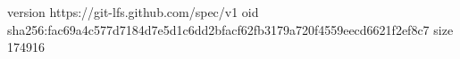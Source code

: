 version https://git-lfs.github.com/spec/v1
oid sha256:fac69a4c577d7184d7e5d1c6dd2bfacf62fb3179a720f4559eecd6621f2ef8c7
size 174916
